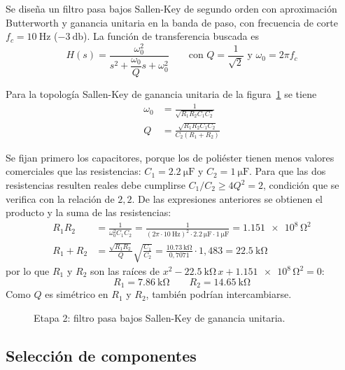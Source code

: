 Se diseña un filtro pasa bajos Sallen-Key de segundo orden con aproximación Butterworth y ganancia unitaria en la
banda de paso, con frecuencia de corte $f_c = \SI{10}{\hertz}$ ($\SI{-3}{\decibel}$). La función de transferencia
buscada es
\begin{equation}
  H(s) = \frac{\omega_0^2}{s^2 + \dfrac{\omega_0}{Q} s + \omega_0^2}
  \qquad \text{con } Q = \frac{1}{\sqrt{2}} \text{ y } \omega_0 = 2 \pi f_c
  \label{eq:campo-hs}
\end{equation}

Para la topología Sallen-Key de ganancia unitaria de la figura~\ref{crkt:sk-unitario} se tiene
\begin{align*}
  \omega_0 &= \frac{1}{\sqrt{R_1 R_2 C_1 C_2}} \\
  Q &= \frac{\sqrt{R_1 R_2 C_1 C_2}}{C_2 \left( R_1 + R_2 \right)}
\end{align*}

Se fijan primero los capacitores, porque los de poliéster tienen menos valores comerciales que las resistencias:
$C_1 = \SI{2.2}{\micro\farad}$ y $C_2 = \SI{1}{\micro\farad}$. Para que las dos resistencias resulten reales debe
cumplirse $C_1 / C_2 \geq 4 Q^2 = 2$, condición que se verifica con la relación de $2{,}2$. De las expresiones
anteriores se obtienen el producto y la suma de las resistencias:
\begin{align*}
  R_1 R_2 &= \frac{1}{\omega_0^2 C_1 C_2} = \frac{1}{(2 \pi \cdot \SI{10}{\hertz})^2 \cdot \SI{2.2}{\micro\farad}
    \cdot \SI{1}{\micro\farad}} = \num{1.151e8}\,\si{\ohm\squared} \\
  R_1 + R_2 &= \frac{\sqrt{R_1 R_2}}{Q} \sqrt{\frac{C_1}{C_2}} = \frac{\SI{10.73}{\kilo\ohm}}{0{,}7071}
    \cdot 1{,}483 = \SI{22.5}{\kilo\ohm}
\end{align*}
por lo que $R_1$ y $R_2$ son las raíces de $x^2 - \SI{22.5}{\kilo\ohm} \, x + \num{1.151e8}\,\si{\ohm\squared} = 0$:
\begin{equation}
  R_1 = \SI{7.86}{\kilo\ohm} \qquad R_2 = \SI{14.65}{\kilo\ohm}
  \label{eq:campo-r1r2}
\end{equation}
Como $Q$ es simétrico en $R_1$ y $R_2$, también podrían intercambiarse.

\begin{figure}[H]
  \centering
  
  \caption{Etapa 2: filtro pasa bajos Sallen-Key de ganancia unitaria.}
  \label{crkt:sk-unitario}
\end{figure}

\subsection{Selección de componentes}
\label{subsec:campo-componentes}

